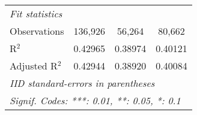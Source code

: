 \begin{tabular}{lccc}
   \midrule
   \emph{Fit statistics}\\
   Observations                    & 136,926                      & 56,264                 & 80,662\\  
   R$^2$                           & 0.42965                      & 0.38974                & 0.40121\\  
   Adjusted R$^2$                  & 0.42944                      & 0.38920                & 0.40084\\  
   \midrule \midrule
   \multicolumn{4}{l}{\emph{IID standard-errors in parentheses}}\\
   \multicolumn{4}{l}{\emph{Signif. Codes: ***: 0.01, **: 0.05, *: 0.1}}\\
\end{tabular}
\par\endgroup



